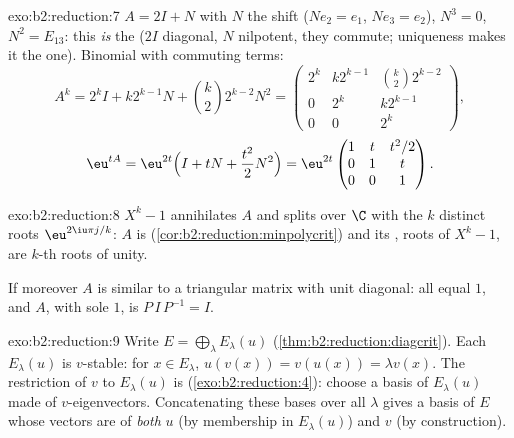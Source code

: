 \begin{solution}{exo:b2:reduction:7}
$A = 2I + N$ with $N$ the shift ($N e_2 = e_1$, $Ne_3 = e_2$),
$N^3 = 0$, $N^2 = E_{13}$: this \emph{is} the 
($2I$ diagonal, $N$ nilpotent, they commute; uniqueness makes it
the one). Binomial with commuting terms:
\[
A^k = 2^k I + k 2^{k-1} N + \binom k2 2^{k-2} N^2
= \begin{pmatrix}
2^k & k2^{k-1} & \binom k2 2^{k-2}\\
0 & 2^k & k2^{k-1}\\
0 & 0 & 2^k
\end{pmatrix},
\]
\[
\eu^{tA} = \eu^{2t}\Bigl(I + tN + \frac{t^2}{2}N^2\Bigr)
= \eu^{2t}\begin{pmatrix}
1 & t & t^2/2\\
0 & 1 & t\\
0 & 0 & 1
\end{pmatrix}.
\]
\end{solution}

\begin{solution}{exo:b2:reduction:8}
$X^k - 1$ annihilates $A$ and splits over $\C$ with the $k$ distinct
roots $\eu^{2\iu\pi j/k}$: $A$ is 
(\cref{cor:b2:reduction:minpolycrit}) and its , roots of
$X^k - 1$, are $k$-th roots of unity.

If moreover $A$ is similar to a triangular matrix with unit
diagonal: all  equal $1$, and $A$,  with
sole  $1$, is $P\,I\,P^{-1} = I$.
\end{solution}

\begin{solution}{exo:b2:reduction:9}
Write $E = \bigoplus_\lambda E_\lambda(u)$
(\cref{thm:b2:reduction:diagcrit}). Each $E_\lambda(u)$ is
$v$-stable: for $x \in E_\lambda$, $u(v(x)) = v(u(x)) = \lambda
v(x)$. The restriction of $v$ to $E_\lambda(u)$ is 
(\cref{exo:b2:reduction:4}): choose a basis of $E_\lambda(u)$ made
of $v$-eigenvectors. Concatenating these bases over all $\lambda$
gives a basis of $E$ whose vectors are  of \emph{both}
$u$ (by membership in $E_\lambda(u)$) and $v$ (by construction).
\end{solution}

